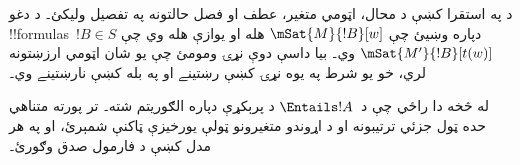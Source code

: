 \documentclass[../../../include/open-logic-section]{subfiles}
\begin{document}
\begin{prob}
د  په استقرا کښې
د محال، اټومي متغير، عطف او فصل حالتونه په تفصيل وليکئ۔ د
دغو !!{formula}s~$!B \in S$ دپاره وښيئ چې
$\mSat{M}{!B}[w]$ هله او يوازې هله وي چې
$\mSat{M'}{!B}[t(w)]$ وي۔ بيا داسې دوې نړۍ ومومئ چې
يو شان اټومي ارزښتونه لري، خو يو شرط په يوه نړۍ کښې
رښتينے او په بله کښې نارښتينے وي۔
\end{prob}

له  څخه دا راځي چې د~$\Entails !A$
د پرېکړې دپاره الګوريتم شته۔ تر پورته متناهي حده ټول
جزئي ترتيبونه او د اړوندو متغيرونو ټولې يورخيزې ټاکنې
شمېرئ، او په هر مدل کښې د فارمول صدق وګورئ۔
\end{document}
